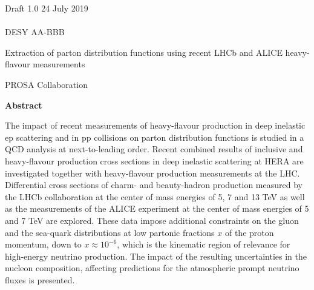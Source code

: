 \documentclass[12pt]{article}
\begin{document}
\begin{titlepage}
\noindent
Draft 1.0  \hfill 24 July 2019\\
\\
DESY AA-BBB %
\\

\vspace{1.3cm}

\begin{center}
  {\bf 

\large

Extraction of parton distribution functions using recent LHCb and ALICE heavy-flavour measurements
  }
  \vspace{1.5cm}

  {\large
    PROSA Collaboration
  }\\

  \vspace{1.2cm}

\end{center}
  \vspace{2.4cm}
\begin{center}
\large
{\bf Abstract}
\vspace{-0.2cm}
\end{center}
The impact of recent measurements of heavy-flavour production in deep inelastic ep scattering and
in pp collisions on parton distribution functions is studied in a QCD analysis at next-to-leading order. 
Recent combined results of inclusive and heavy-flavour production cross sections in deep inelastic scattering at HERA are 
investigated together with heavy-flavour production measurements at the LHC. Differential cross sections of charm- and 
beauty-hadron production measured by the LHCb collaboration at the center of mass energies of 5, 7 and 13 TeV as well 
as the measurements of the ALICE experiment at the center of mass energies of 5 and 7 TeV are explored. 
These data impose additional constraints on the gluon and the sea-quark distributions at low partonic fractions
$x$ of the proton momentum, down to $x\approx10^{-6}$, which is the kinematic region of relevance for high-energy 
neutrino production. The impact of the resulting uncertainties in the nucleon composition, affecting predictions for 
the atmospheric prompt neutrino fluxes is presented.

\vfill
\end{titlepage}


%
%
\newpage
\end{document}
